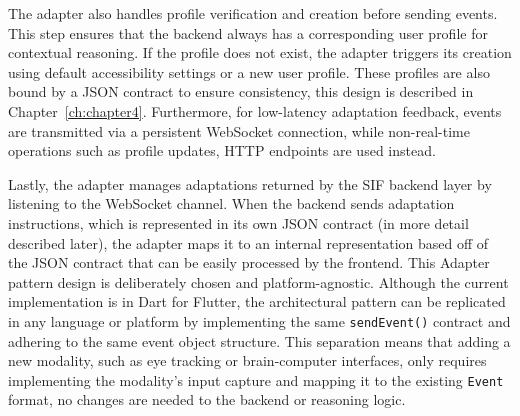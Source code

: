 The adapter also handles profile verification and creation before sending events. This step ensures that the backend always has a corresponding user profile for contextual reasoning. If the profile does not exist, the adapter triggers its creation using default accessibility settings or a new user profile. These profiles are also bound by a JSON contract to ensure consistency, this design is described in Chapter~\ref{ch:chapter4}. Furthermore, for low-latency adaptation feedback, events are transmitted via a persistent WebSocket connection, while non-real-time operations such as profile updates, HTTP endpoints are used instead.

Lastly, the adapter manages adaptations returned by the SIF backend layer by listening to the WebSocket channel. When the backend sends adaptation instructions, which is represented in its own JSON contract (in more detail described later), the adapter maps it to an internal representation based off of the JSON contract that can be easily processed by the frontend. This Adapter pattern design is deliberately chosen and platform-agnostic. Although the current implementation is in Dart for Flutter, the architectural pattern can be replicated in any language or platform by implementing the same \texttt{sendEvent()} contract and adhering to the same event object structure. This separation means that adding a new modality, such as eye tracking or brain-computer interfaces, only requires implementing the modality’s input capture and mapping it to the existing \texttt{Event} format, no changes are needed to the backend or reasoning logic.

